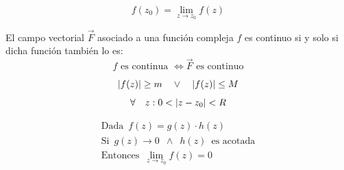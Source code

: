 \begin{mdframed}[style=DefinitionFrame]
    \begin{defn}
    \end{defn}
    \begin{equation*}
        f(z_0)=\lim_{z \to z_0}f(z)
    \end{equation*}
\end{mdframed}

\begin{mdframed}[style=PropertyFrame]
    \begin{prop}
    \end{prop}
    El campo vectorial $\Vec{F}$ asociado a una función compleja $f$ es continuo si y solo si dicha función también lo es:
    \begin{equation*}
        \textrm{$f$ es continua $\iff \Vec{F}$ es continuo}
    \end{equation*}
\end{mdframed}

\begin{mdframed}[style=DefinitionFrame]
    \begin{defn}
    \end{defn}
    \begin{gather*}
        {\left| {f(z)} \right|} \geq m \quad \lor \quad {\left| {f(z)} \right|} \leq M
        \\[1ex]
        \forall \quad z: 0 < {\left| {z-z_0} \right|} < R
    \end{gather*}
\end{mdframed}

\begin{mdframed}[style=PropertyFrame]
    \begin{prop}
    \end{prop}
    \begin{gather*}
        \textrm{Dada} \enspace f(z)=g(z) \cdot h(z)
        \\
        \textrm{Si} \enspace g(z) \to 0 \enspace \land \enspace h(z) \enspace \textrm{es acotada}
        \\
        \textrm{Entonces} \enspace \lim_{z \to z_0} f(z) = 0
    \end{gather*}
\end{mdframed}


